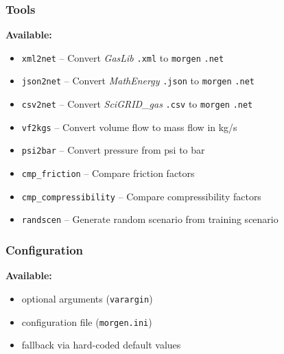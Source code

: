 \documentclass[%
aspectratio=43 %
,table %
]{beamer}
\begin{document}

\begin{frame}\frametitle{Tools}

\large

\textbf{Available:}
\begin{itemize}

 \item \texttt{xml2net} -- Convert \emph{GasLib} \texttt{.xml} to \texttt{morgen} \texttt{.net}

 \item \texttt{json2net} -- Convert \emph{MathEnergy} \texttt{.json} to \texttt{morgen} \texttt{.net}

 \item \texttt{csv2net} -- Convert \emph{SciGRID\_gas} \texttt{.csv} to \texttt{morgen} \texttt{.net}

 \item \texttt{vf2kgs} -- Convert volume flow to mass flow in kg/s

 \item \texttt{psi2bar} -- Convert pressure from psi to bar

 \item \texttt{cmp\_friction} -- Compare friction factors

 \item \texttt{cmp\_compressibility} -- Compare compressibility factors

 \item \texttt{randscen} -- Generate random scenario from training scenario

\end{itemize}

\end{frame}


\begin{frame}\frametitle{Configuration}

\large

\textbf{Available:}
\begin{itemize}

 \item optional arguments (\texttt{varargin})

 \item configuration file (\texttt{morgen.ini})

 \item fallback via hard-coded default values

\end{itemize}

\end{frame}
\end{document}

